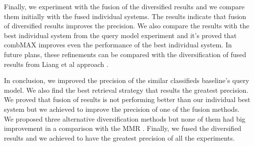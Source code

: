 Finally, we experiment with the fusion of the diversified results and we compare them initially with the fused individual systems. The results indicate that fusion of diversified results improves the precision. We also compare the results with the best individual system from the query model experiment and it's proved that combMAX improves even the performance of the best individual system. In future plans, these refinements can be compared with the diversification of fused results from Liang et al approach \cite{LiangRenMaarten}.


In conclusion, we improved the precision of the similar classifieds baseline's query model. We also find the best retrieval strategy that results the greatest precision. We proved that fusion of results is not performing better than our individual best system but we achieved to improve the precision of one of the fusion methods. We proposed three alternative diversification methods but none of them had big improvement in a comparison with the MMR \cite{CarbonellGoldstein}. Finally, we fused the diversified results and we achieved to have the greatest precision of all the experiments. 
